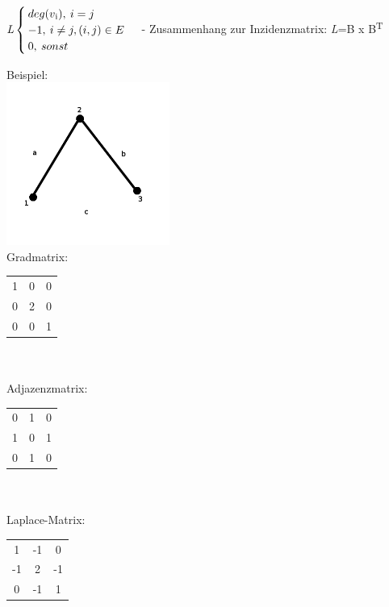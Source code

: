 $\textit{L}\begin{cases}deg(v\textsubscript{i}),\>i=j\\-1,\>i\neq j, (i,j) \in E \\0,\>sonst\end{cases}$\newline\newline
- Zusammenhang zur Inzidenzmatrix: \textit{L}=B x B\textsuperscript{T}\newline\newline

Beispiel:\\
\includegraphics[width=0.4\textwidth]{lectures/161028/pix/dreieck.png}\\
Gradmatrix:\begin{tabular}{ccc}
1 & 0 & 0 \\
0 & 2 & 0 \\
0 & 0 & 1 \\
\end{tabular}
\\\\
Adjazenzmatrix:\begin{tabular}{ccc}
0 & 1 & 0 \\
1 & 0 & 1 \\
0 & 1 & 0 \\
\end{tabular}
\\\\
Laplace-Matrix:\begin{tabular}{ccc}
1 & -1 & 0 \\
-1 & 2 & -1 \\
0 & -1 & 1 \\
\end{tabular}

